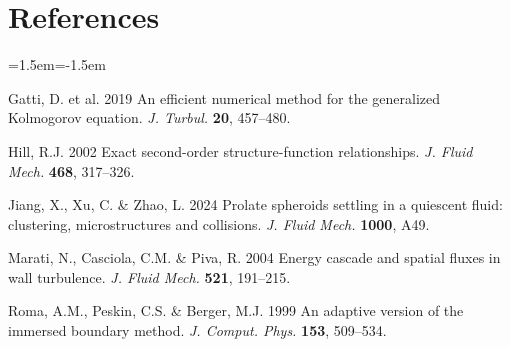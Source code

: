 \documentclass[11pt,a4paper]{article}
\begin{document}
\section*{References}
\begin{list}{}{\leftmargin=1.5em\itemindent=-1.5em\itemsep=1pt}
\item Gatti, D. et al. 2019
  An efficient numerical method for the generalized Kolmogorov equation.
  \emph{J. Turbul.} \textbf{20}, 457--480.
\item Hill, R.J. 2002 Exact second-order structure-function relationships.
  \emph{J. Fluid Mech.} \textbf{468}, 317--326.
\item Jiang, X., Xu, C. \& Zhao, L. 2024 Prolate spheroids settling in a
  quiescent fluid: clustering, microstructures and collisions. \emph{J. Fluid
  Mech.} \textbf{1000}, A49.
\item Marati, N., Casciola, C.M. \& Piva, R. 2004 Energy cascade and spatial
  fluxes in wall turbulence. \emph{J. Fluid Mech.} \textbf{521}, 191--215.
\item Roma, A.M., Peskin, C.S. \& Berger, M.J. 1999 An adaptive version of the
  immersed boundary method. \emph{J. Comput. Phys.} \textbf{153}, 509--534.
\end{list}
\end{document}

